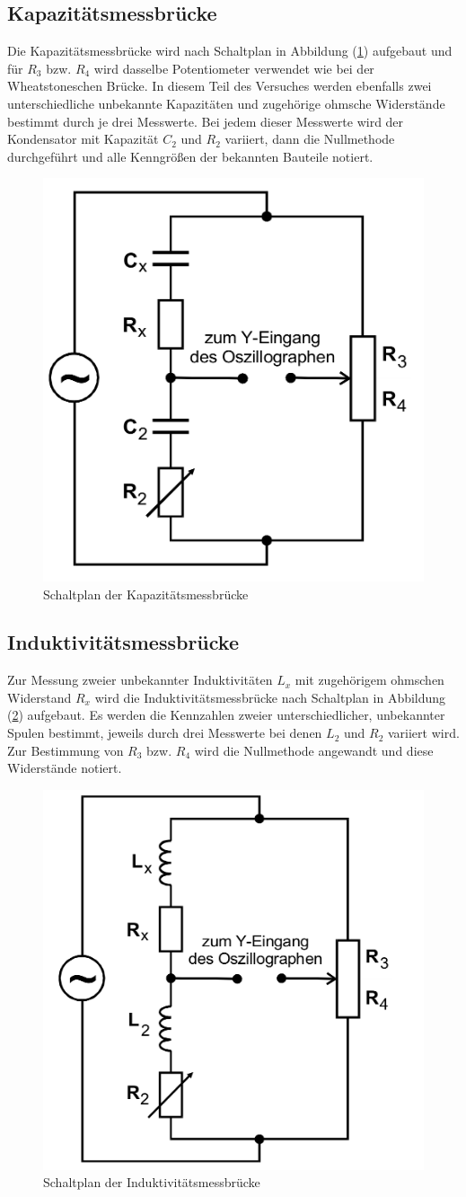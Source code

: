 \subsection{Kapazitätsmessbrücke}
Die Kapazitätsmessbrücke wird nach Schaltplan in Abbildung (\ref{pic:Kapazitaetsmessbruecke}) aufgebaut und für $R_3$ bzw. $R_4$ wird dasselbe Potentiometer
verwendet wie bei der Wheatstoneschen Brücke. In diesem Teil des Versuches werden ebenfalls zwei unterschiedliche unbekannte Kapazitäten und zugehörige 
ohmsche Widerstände bestimmt durch je drei Messwerte. Bei jedem dieser Messwerte wird der Kondensator mit Kapazität $C_2$ und $R_2$ variiert, dann die Nullmethode durchgeführt und alle Kenngrößen
der bekannten Bauteile notiert. 
\begin{figure}[H]
    \centering
    \includegraphics[width=0.4\linewidth]{Kapazitaet.png}
    \caption{Schaltplan der Kapazitätsmessbrücke}
    \label{pic:Kapazitaetsmessbruecke}
\end{figure}
\subsection{Induktivitätsmessbrücke}
Zur Messung zweier unbekannter Induktivitäten $L_x$ mit zugehörigem ohmschen Widerstand $R_x$ wird die Induktivitätsmessbrücke nach Schaltplan in Abbildung 
(\ref{pic:Induktivitaetsmessbruecke}) aufgebaut. Es werden die Kennzahlen zweier unterschiedlicher, unbekannter Spulen bestimmt, jeweils durch drei Messwerte bei 
denen $L_2$ und $R_2$ variiert wird. Zur Bestimmung von $R_3$ bzw. $R_4$ wird die Nullmethode angewandt und diese Widerstände notiert. 
\begin{figure}[H]
    \centering
    \includegraphics[width=0.4\linewidth]{Induktivitaet.png}
    \caption{Schaltplan der Induktivitätsmessbrücke}
    \label{pic:Induktivitaetsmessbruecke}
\end{figure} 
